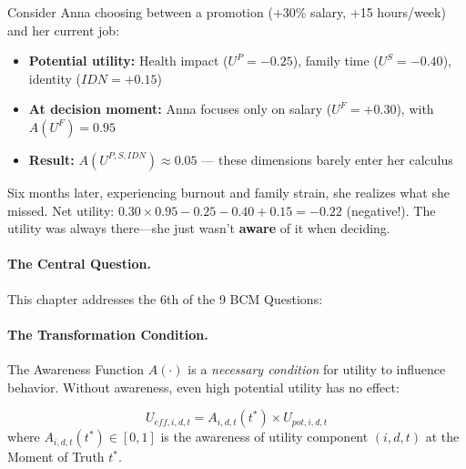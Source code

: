 \begin{intuition}
Consider Anna choosing between a promotion (+30\% salary, +15 hours/week) and her current job:
\begin{itemize}[nosep]
  \item \textbf{Potential utility:} Health impact ($U^P = -0.25$), family time ($U^S = -0.40$), identity ($IDN = +0.15$)
  \item \textbf{At decision moment:} Anna focuses only on salary ($U^F = +0.30$), with $A(U^F) = 0.95$
  \item \textbf{Result:} $A(U^{P,S,IDN}) \approx 0.05$ --- these dimensions barely enter her calculus
\end{itemize}
Six months later, experiencing burnout and family strain, she realizes what she missed.
Net utility: $0.30 \times 0.95 - 0.25 - 0.40 + 0.15 = -0.22$ (negative!).
The utility was always there---she just wasn't \textbf{aware} of it when deciding.
\end{intuition}

\paragraph{The Central Question.}
This chapter addresses the 6th of the 9 BCM Questions:

\begin{center}
\end{center}

\paragraph{The Transformation Condition.}
The Awareness Function $A(\cdot)$ is a \emph{necessary condition} for utility to
influence behavior. Without awareness, even high potential utility has no effect:

\begin{definition}
\begin{equation}
U_{eff,i,d,t} = A_{i,d,t}(t^*) \times U_{pot,i,d,t}
\label{eq:transformation-principle}
\end{equation}
where $A_{i,d,t}(t^*) \in [0,1]$ is the awareness of utility component $(i,d,t)$
at the Moment of Truth $t^*$.
\end{definition}

